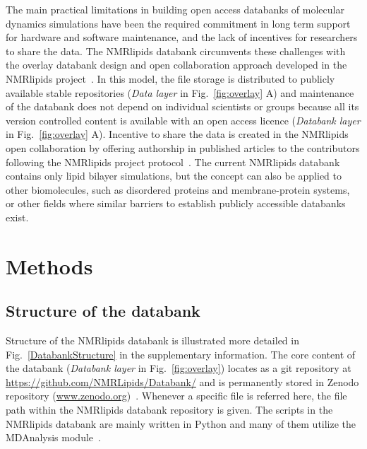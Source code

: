 \documentclass[fleqn,10pt]{wlscirep}
\begin{document}
The main practical limitations in building open access databanks of molecular dynamics simulations have been the required commitment in long term support for hardware and software maintenance, and the lack of incentives for researchers to share the data. The NMRlipids databank circumvents these challenges with the overlay databank design and open collaboration approach developed in the NMRlipids project~\cite{botan15}. In this model, the file storage is distributed to publicly available stable repositories (\textit{Data layer} in Fig.~\ref{fig:overlay} A) and maintenance of the databank does not depend on individual scientists or groups because all its version controlled content is available with an open access licence (\textit{Databank layer} in Fig.~\ref{fig:overlay} A). Incentive to share the data is created in the NMRlipids open collaboration by offering authorship in published articles to the contributors following the NMRlipids project protocol~\cite{botan15}. The current NMRlipids databank contains only lipid bilayer simulations, but the concept can also be applied to other biomolecules, such as disordered proteins and membrane-protein systems, or other fields where similar barriers to establish publicly accessible databanks exist. 



\newpage


\section{Methods}


\subsection{Structure of the databank}
Structure of the NMRlipids databank is illustrated more detailed in Fig.~\ref{DatabankStructure} in the supplementary information. The core content of the databank (\textit{Databank layer} in Fig.~\ref{fig:overlay}) locates as a git repository at \url{https://github.com/NMRLipids/Databank/} and is permanently stored in Zenodo repository (\url{www.zenodo.org})~\cite{??}. Whenever a specific file is referred here, the file path within the NMRlipids databank repository is given. The scripts in the NMRlipids databank are mainly written in Python and many of them utilize the MDAnalysis module~\cite{gowers2019mdanalysis,michaud2011mdanalysis}.
\end{document}

